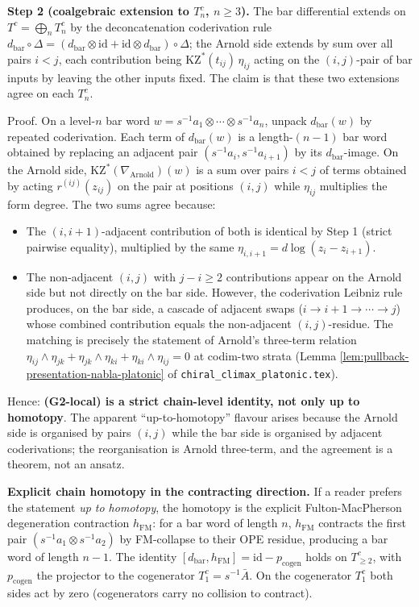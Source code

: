 \documentclass[12pt]{article}
\providecommand{\KZ}{\mathrm{KZ}}
\providecommand{\Arn}{\mathrm{Arnold}}
\providecommand{\dbar}{d_{\mathrm{bar}}}
\theoremstyle{definition}
\begin{document}
\textbf{Step 2 (coalgebraic extension to $T^c_n$, $n \geq 3$).}
The bar differential extends on $T^c = \bigoplus_n T^c_n$ by the
deconcatenation coderivation rule
$\dbar \circ \Delta = (\dbar \otimes \mathrm{id} + \mathrm{id}\otimes \dbar) \circ \Delta$;
the Arnold side extends by sum over all pairs $i < j$, each
contribution being $\KZ^{*}(t_{ij})\,\eta_{ij}$ acting on the
$(i,j)$-pair of bar inputs by leaving the other inputs fixed.
The claim is that these two extensions agree on each $T^c_n$.

Proof.  On a level-$n$ bar word
$w = s^{-1}a_1 \otimes \cdots \otimes s^{-1}a_n$, unpack
$\dbar(w)$ by repeated coderivation.  Each term of $\dbar(w)$
is a length-$(n-1)$ bar word obtained by replacing an adjacent
pair $(s^{-1}a_i, s^{-1}a_{i+1})$ by its $\dbar$-image.  On the
Arnold side, $\KZ^{*}(\nabla_{\Arn})(w)$ is a sum over pairs
$i < j$ of terms obtained by acting $r^{(ij)}(z_{ij})$ on the
pair at positions $(i,j)$ while $\eta_{ij}$ multiplies the form
degree.  The two sums agree because:

\begin{itemize}
\item The $(i,i+1)$-adjacent contribution of both is identical
   by Step 1 (strict pairwise equality), multiplied by the
   same $\eta_{i,i+1} = d\log(z_i - z_{i+1})$.
\item The non-adjacent $(i,j)$ with $j - i \geq 2$ contributions
   appear on the Arnold side but not directly on the bar side.
   However, the coderivation Leibniz rule produces, on the bar
   side, a cascade of adjacent swaps ($i \to i+1 \to \cdots \to j$)
   whose combined contribution equals the non-adjacent
   $(i,j)$-residue.  The matching is precisely the statement of
   Arnold's three-term relation
   $\eta_{ij}\wedge\eta_{jk} + \eta_{jk}\wedge\eta_{ki} + \eta_{ki}\wedge\eta_{ij} = 0$
   at codim-two strata (Lemma \ref{lem:pullback-presentation-nabla-platonic}
   of \texttt{chiral\_climax\_platonic.tex}).
\end{itemize}

Hence: \textbf{(G2-local) is a strict chain-level identity, not
only up to homotopy}.  The apparent ``up-to-homotopy'' flavour
arises because the Arnold side is organised by pairs
$(i,j)$ while the bar side is organised by adjacent
coderivations; the reorganisation is Arnold three-term, and the
agreement is a theorem, not an ansatz.

\textbf{Explicit chain homotopy in the contracting direction.}
If a reader prefers the statement \emph{up to homotopy}, the
homotopy is the explicit Fulton-MacPherson degeneration
contraction $h_{\mathrm{FM}}$: for a bar word of length $n$,
$h_{\mathrm{FM}}$ contracts the first pair
$(s^{-1}a_1 \otimes s^{-1}a_2)$ by FM-collapse to their OPE
residue, producing a bar word of length $n - 1$.  The identity
$[\dbar, h_{\mathrm{FM}}] = \mathrm{id} - p_{\mathrm{cogen}}$
holds on $T^c_{\geq 2}$, with $p_{\mathrm{cogen}}$ the
projector to the cogenerator $T^c_{1} = s^{-1}\bar A$.  On the
cogenerator $T^c_{1}$ both sides act by zero
(cogenerators carry no collision to contract).
\end{document}
